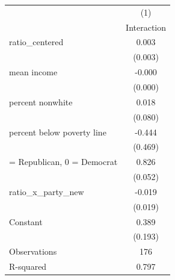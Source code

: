 \begin{tabular}{lc}
\toprule
                    &\multicolumn{1}{c}{(1)}\\
                    &\multicolumn{1}{c}{Interaction}\\
\midrule
ratio\_centered      &       0.003         \\
                    &     (0.003)         \\
\addlinespace
mean income         &      -0.000\sym{**} \\
                    &     (0.000)         \\
\addlinespace
percent nonwhite    &       0.018         \\
                    &     (0.080)         \\
\addlinespace
percent below poverty line&      -0.444         \\
                    &     (0.469)         \\
\addlinespace
1 = Republican, 0 = Democrat&       0.826\sym{***}\\
                    &     (0.052)         \\
\addlinespace
ratio\_x\_party\_new   &      -0.019         \\
                    &     (0.019)         \\
\addlinespace
Constant            &       0.389\sym{**} \\
                    &     (0.193)         \\
\midrule
Observations        &         176         \\
R-squared           &       0.797         \\
\bottomrule
\end{tabular}

